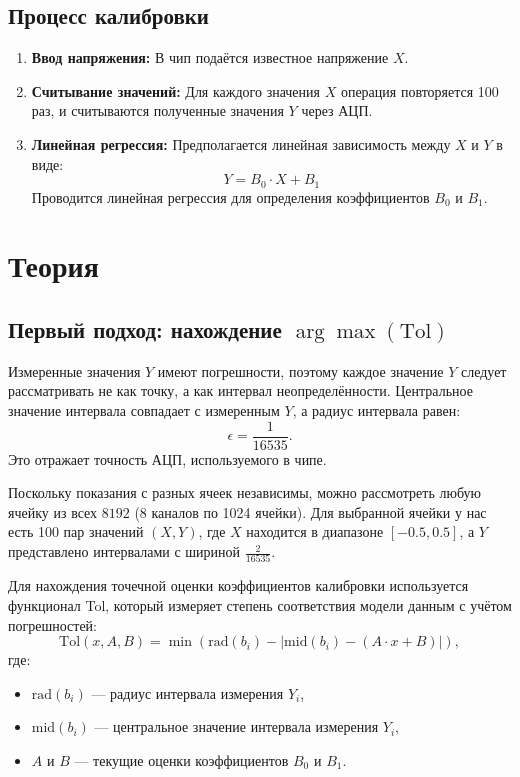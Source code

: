 \documentclass[a4paper,14pt]{extarticle}
\begin{document}
\subsection*{Процесс калибровки}
\begin{enumerate}
    \item \textbf{Ввод напряжения:} В чип подаётся известное напряжение $X$.
    \item \textbf{Считывание значений:} Для каждого значения $X$ операция повторяется 100 раз, и считываются полученные значения $Y$ через АЦП.
    \item \textbf{Линейная регрессия:} Предполагается линейная зависимость между $X$ и $Y$ в виде:
    \[
    Y = B_0 \cdot X + B_1
    \]
    Проводится линейная регрессия для определения коэффициентов $B_0$ и $B_1$.
\end{enumerate}

\section{Теория}
\subsection{Первый подход: нахождение $\arg\max(\text{Tol})$}


Измеренные значения $Y$ имеют погрешности, поэтому каждое значение $Y$ следует рассматривать не как точку, а как интервал неопределённости. Центральное значение интервала совпадает с измеренным $Y$, а радиус интервала равен:
\[
\epsilon = \frac{1}{16535}.
\]
Это отражает точность АЦП, используемого в чипе.


Поскольку показания с разных ячеек независимы, можно рассмотреть любую ячейку из всех $8192$ (8 каналов по 1024 ячейки). Для выбранной ячейки у нас есть 100 пар значений $(X, Y)$, где $X$ находится в диапазоне $[-0.5, 0.5]$, а $Y$ представлено интервалами с шириной $\frac{2}{16535}$.

Для нахождения точечной оценки коэффициентов калибровки используется функционал Tol, который измеряет степень соответствия модели данным с учётом погрешностей:
\[
\text{Tol}(x, A, B) = \min \left( \text{rad}(b_i) - \left| \text{mid}(b_i) - (A \cdot x + B) \right| \right),
\]
где:
\begin{itemize}
    \item $\text{rad}(b_i)$ — радиус интервала измерения $Y_i$,
    \item $\text{mid}(b_i)$ — центральное значение интервала измерения $Y_i$,
    \item $A$ и $B$ — текущие оценки коэффициентов $B_0$ и $B_1$.
\end{itemize}
\end{document}
